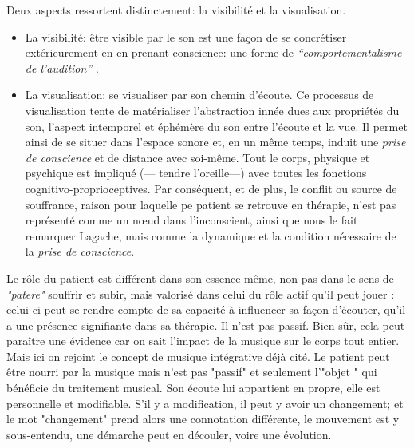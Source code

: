 Deux aspects ressortent distinctement: la visibilité et la visualisation.
\begin{itemize}
 
\item La visibilité: être visible par le son est une façon de se concrétiser extérieurement en en prenant conscience: une forme de \textit{``comportementalisme de l'audition''} .


\item La visualisation: se visualiser par son chemin d'écoute.  
Ce processus de visualisation tente de matérialiser l'abstraction innée dues aux propriétés du son, l'aspect intemporel et éphémère du son entre l'écoute et la vue.
Il permet ainsi de se situer dans l'espace sonore et, en un même temps, induit une \textit{prise de conscience }et de distance avec soi-même. Tout le corps, physique et psychique est impliqué (--- tendre l'oreille---) avec toutes les fonctions cognitivo-proprioceptives.
Par conséquent, et de plus, le conflit ou source de souffrance, raison pour laquelle pe
patient se retrouve en thérapie, n’est pas représenté
comme un nœud dans l’inconscient, ainsi que nous le fait remarquer Lagache, mais comme la
dynamique et la condition nécessaire de la \textit{prise de
  conscience}.
\end{itemize}


	
	Le rôle du patient est différent dans son
        essence même, non pas dans le sens de\textit{ "patere"
        }souffrir et subir, mais valorisé dans celui du rôle actif
        qu'il peut jouer : celui-ci peut se rendre compte de sa
        capacité à influencer sa façon d'écouter, qu'il a une présence
        signifiante dans sa thérapie.  Il n'est pas passif. Bien sûr,
        cela peut paraître une évidence car on sait l'impact de la
        musique sur le corps tout entier. Mais ici on rejoint  le
        concept de musique intégrative déjà cité\autocite[Cf.] {vrait_musicotherapie_2018}. Le patient peut être nourri par la musique mais n'est pas "passif" et seulement l'"objet " qui bénéficie du traitement musical. Son  écoute lui appartient en propre, elle est personnelle et modifiable. S'il y a modification, il peut y avoir un changement; et le mot "changement" prend alors une connotation différente,  le mouvement est y  sous-entendu,  une démarche peut en découler, voire une évolution. 



